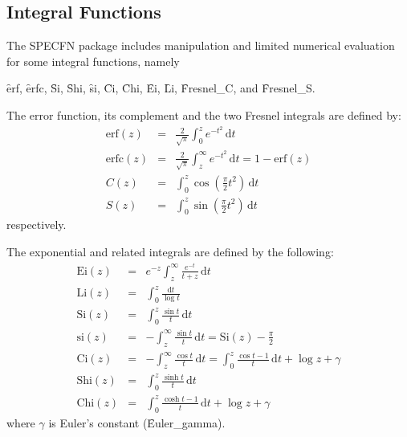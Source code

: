\subsection{Integral Functions}
\hypertarget{operator:CHI}{}
\hypertarget{operator:CI}{}
\hypertarget{operator:DILOG}{}
\hypertarget{operator:EI}{}
\hypertarget{operator:Erf}{}
\hypertarget{operator:SI}{}
\hypertarget{operator:Shi}{}
\hypertarget{operator:Fresnel_S}{}
\hypertarget{operator:Fresnel_C}{}
\hypertarget{INTEGF}{}

The SPECFN package includes manipulation and limited numerical
evaluation for some integral functions, namely

\f{erf}, \f{erfc}, \f{Si}, \f{Shi}, \f{si}, \f{Ci}, \f{Chi}, \f{Ei}, \f{Li},  
\f{Fresnel\_C}, and \f{Fresnel\_S}.

The error function, its complement and the two Fresnel integrals are defined by:
\begin{eqnarray*}
\mathrm{erf}(z) & = & \frac{2}{\sqrt \pi}\int_0^z e^{-t^2}\, \mathrm{d}t\\
\mathrm{erfc}(z) & = & \frac{2}{\sqrt \pi}\int_z^\infty e^{-t^2}\, \mathrm{d}t
 = 1 - \mathrm{erf}(z)\\
C(z) & = & \int_0^z \cos\left(\frac{\pi}{2} t^2\right)\, \mathrm{d}t\\
S(z) & = & \int_0^z \sin\left(\frac{\pi}{2} t^2\right)\, \mathrm{d}t
\end{eqnarray*}
respectively.

The exponential and related integrals are defined by the following:
\begin{eqnarray*}
\mathrm{Ei}(z) & = & e^{-z}\int_z^\infty \frac{e^{-t}} {t+z}\, \mathrm{d}t\\
\mathrm{Li}(z) & = & \int_0^z \frac{\mathrm{d}t} {\log t}\\
\mathrm{Si}(z) & = & \int_0^z \frac{\sin t} {t}\, \mathrm{d}t\\
\mathrm{si}(z) & = & -\int_z^\infty \frac{\sin t} {t}\, \mathrm{d}t
 = \mathrm{Si}(z) - \frac{\pi}{2}\\
\mathrm{Ci}(z) & = & -\int_z^\infty  \frac{\cos t} {t}\, \mathrm{d}t
=  \int_0^z \frac{\cos t -1} {t}\, \mathrm{d}t + \log z +\gamma\\
\mathrm{Shi}(z) & = & \int_0^z \frac{\sinh t} {t}\, \mathrm{d}t\\
\mathrm{Chi}(z) & = & \int_0^z \frac{\cosh t -1} {t}\, \mathrm{d}t +\log z +\gamma
\end{eqnarray*}
where $\gamma$ is Euler's constant (\f{Euler\_gamma}).

